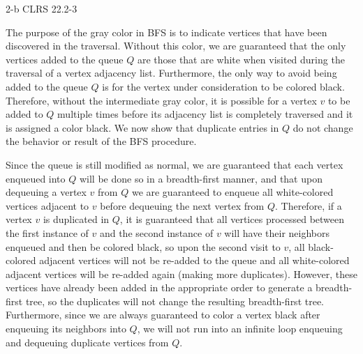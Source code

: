 \documentclass[11pt]{article}
\begin{document}
\begin{prob}{2-b}
CLRS 22.2-3 
\end{prob}
\begin{sol} 

The purpose of the gray color in BFS is to indicate vertices that have been discovered in the traversal. Without this color, we are guaranteed that the only vertices added to the queue $Q$ are those that are white when visited during the traversal of a vertex adjacency list. Furthermore, the only way to avoid being added to the queue $Q$ is for the vertex under consideration to be colored black. Therefore, without the intermediate gray color, it is possible for a vertex $v$ to be added to $Q$ multiple times before its adjacency list is completely traversed and it is assigned a color black. We now show that duplicate entries in $Q$ do not change the behavior or result of the BFS procedure.

Since the queue is still modified as normal, we are guaranteed that each vertex enqueued into $Q$ will be done so in a breadth-first manner, and that upon dequeuing a vertex $v$ from $Q$ we are guaranteed to enqueue all white-colored vertices adjacent to $v$ before dequeuing the next vertex from $Q$. Therefore, if a vertex $v$ is duplicated in $Q$, it is guaranteed that all vertices processed between the first instance of $v$ and the second instance of $v$ will have their neighbors enqueued and then be colored black, so upon the second visit to $v$, all black-colored adjacent vertices will not be re-added to the queue and all white-colored adjacent vertices will be re-added again (making more duplicates). However, these vertices have already been added in the appropriate order to generate a breadth-first tree, so the duplicates will not change the resulting breadth-first tree. Furthermore, since we are always guaranteed to color a vertex black after enqueuing its neighbors into $Q$, we will not run into an infinite loop enqueuing and dequeuing duplicate vertices from $Q$.

\begin{comment}
Let $v$ be a vertex in that was just added to $Q$ for the first time. If at a later point in time (after $v$ was added to $Q$) $v$ is re-added to $Q$, we now have the sequence $v, v_{1}, v_{2}, ..., v_{i}, v$ contained in $Q$. Based on the iterative approach to the BFS procedure, all of the vertices $v, v_{1}, v_{2}, ..., v_{i}$ will be colored black by the time the second instance of $v$ is dequeued from $Q$ to be processed. This has two implications:


\end{comment}
\end{sol}
\end{document}
